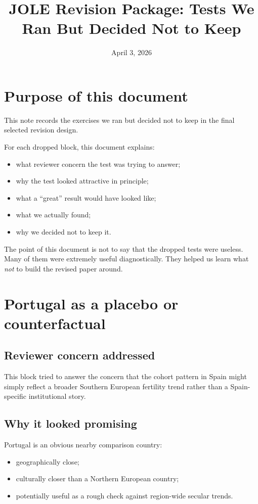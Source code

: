 \documentclass[11pt]{article}
\title{JOLE Revision Package: Tests We Ran But Decided Not to Keep}
\author{}
\date{April 3, 2026}
\begin{document}
\maketitle

\section*{Purpose of this document}

This note records the exercises we ran but decided not to keep in the final selected revision design.

For each dropped block, this document explains:
\begin{itemize}[leftmargin=*]
\item what reviewer concern the test was trying to answer;
\item why the test looked attractive in principle;
\item what a ``great'' result would have looked like;
\item what we actually found;
\item why we decided not to keep it.
\end{itemize}

The point of this document is not to say that the dropped tests were useless. Many of them were extremely useful diagnostically. They helped us learn what \emph{not} to build the revised paper around.

\section{Portugal as a placebo or counterfactual}

\subsection*{Reviewer concern addressed}

This block tried to answer the concern that the cohort pattern in Spain might simply reflect a broader Southern European fertility trend rather than a Spain-specific institutional story.

\subsection*{Why it looked promising}

Portugal is an obvious nearby comparison country:
\begin{itemize}[leftmargin=*]
\item geographically close;
\item culturally closer than a Northern European country;
\item potentially useful as a rough check against region-wide secular trends.
\end{itemize}
\end{document}
